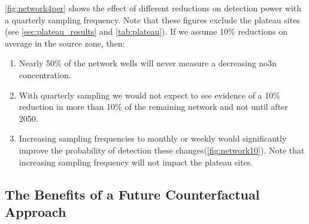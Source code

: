 \autoref{fig:network4per} shows the effect of different reductions on detection power with a quarterly sampling frequency.
Note that these figures exclude the plateau sites (see \autoref{sec:plateau_results} and \autoref{tab:plateau}).
If we assume 10\% reductions on average in the source zone, then:
\begin{enumerate}
    \item Nearly 50\% of the network wells will never measure a decreasing \gls{no3n} concentration.
    \item With quarterly sampling we would not expect to see evidence of a 10\% reduction in more than 10\% of the remaining network and not until after 2050.
    \item Increasing sampling frequencies to monthly or weekly would significantly improve the probability of detection these changes(\autoref{fig:network10}). Note that increasing sampling frequency will not impact the plateau sites.
\end{enumerate}

\begin{landscape}




\end{landscape}

\subsection[Counterfactual Approach]{The Benefits of a Future Counterfactual Approach} \label{sec:counterfactual}

